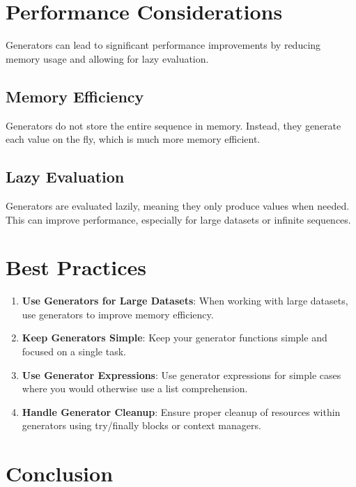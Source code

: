 \documentclass[
  letterpaper,
  DIV=11,
  numbers=noendperiod]{scrreprt}
\providecommand{\tightlist}{%
  \setlength{\itemsep}{0pt}\setlength{\parskip}{0pt}}\usepackage{longtable,booktabs,array}
\begin{document}
\section{Performance Considerations}\label{performance-considerations}

Generators can lead to significant performance improvements by reducing
memory usage and allowing for lazy evaluation.

\subsection{Memory Efficiency}\label{memory-efficiency}

Generators do not store the entire sequence in memory. Instead, they
generate each value on the fly, which is much more memory efficient.

\subsection{Lazy Evaluation}\label{lazy-evaluation}

Generators are evaluated lazily, meaning they only produce values when
needed. This can improve performance, especially for large datasets or
infinite sequences.

\section{Best Practices}\label{best-practices-4}

\begin{enumerate}
\def\labelenumi{\arabic{enumi}.}
\tightlist
\item
  \textbf{Use Generators for Large Datasets}: When working with large
  datasets, use generators to improve memory efficiency.
\item
  \textbf{Keep Generators Simple}: Keep your generator functions simple
  and focused on a single task.
\item
  \textbf{Use Generator Expressions}: Use generator expressions for
  simple cases where you would otherwise use a list comprehension.
\item
  \textbf{Handle Generator Cleanup}: Ensure proper cleanup of resources
  within generators using try/finally blocks or context managers.
\end{enumerate}

\section{Conclusion}\label{conclusion-36}
\end{document}
